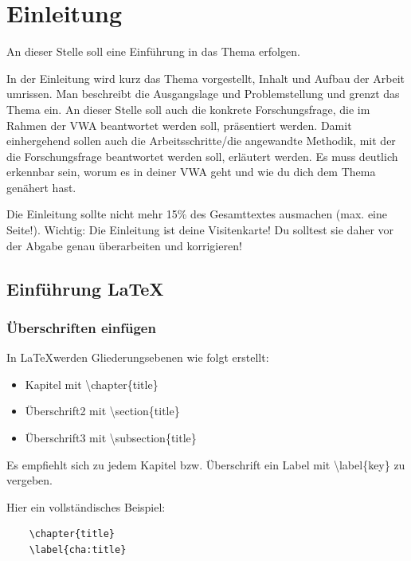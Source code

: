 \chapter*{Einleitung}
\label{cha:einleitung}
An dieser Stelle soll eine Einführung in das Thema erfolgen.

In der Einleitung wird kurz das Thema vorgestellt, Inhalt und Aufbau der Arbeit umrissen. Man beschreibt die Ausgangslage und Problemstellung und grenzt das Thema ein. An dieser Stelle soll auch die konkrete Forschungsfrage, die im Rahmen der VWA beantwortet werden soll, präsentiert werden. Damit einhergehend sollen auch die Arbeitsschritte/die angewandte Methodik, mit der die Forschungsfrage beantwortet werden soll, erläutert werden. Es muss deutlich erkennbar sein, worum es in deiner VWA geht und wie du dich dem Thema genähert hast.

Die Einleitung sollte nicht mehr 15\% des Gesamttextes ausmachen (max. eine Seite!). Wichtig: Die Einleitung ist deine Visitenkarte! Du solltest sie daher vor der Abgabe genau überarbeiten und korrigieren!

\section{Einführung \LaTeX}
\label{sec:einfuehrung_latex}

\subsection{Überschriften einfügen}
\label{subsec:ueberschrift_einfuegen}
In \LaTeX werden Gliederungsebenen wie folgt erstellt:

\begin{itemize}
	\item Kapitel mit \textbackslash chapter\{title\}
	\item Überschrift2 mit \textbackslash section\{title\}
	\item Überschrift3 mit \textbackslash subsection\{title\}
\end{itemize}

Es empfiehlt sich zu jedem Kapitel bzw. Überschrift ein Label mit \textbackslash label\{key\} zu vergeben.

Hier ein vollständisches Beispiel:

\begin{verbatim}
	\chapter{title}
	\label{cha:title}
\end{verbatim}

